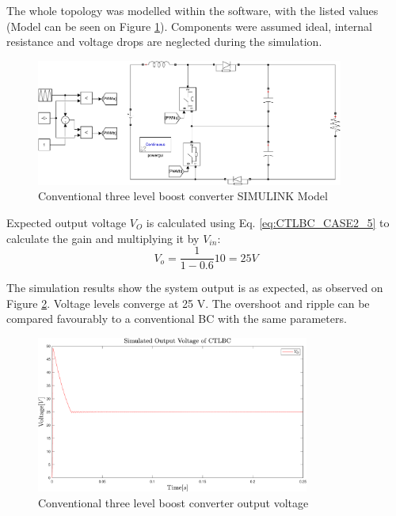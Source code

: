 The whole topology was modelled within the software, with the listed values (Model can be seen on Figure \ref{fig:Model_CTLBC}). Components were assumed ideal, internal resistance and voltage drops are neglected during the simulation. 

\begin{figure} [H]
   \centering
   \includegraphics[width=0.9\textwidth]{figures/dConventionalThreeLevelBC/Model_CTLBC.pdf}
    \caption{Conventional three level boost converter SIMULINK Model}
	\label{fig:Model_CTLBC}
\end{figure}

Expected output voltage $V_O$ is calculated using Eq. \ref{eq:CTLBC_CASE2_5} to calculate the gain and multiplying it by $V_{in}$: 
\begin{equation}
	{V_o}= \frac{1}{1-0.6}10=25V
	\label{eq:Simulation_CTLBC}
\end{equation}

The simulation results show the system output is as expected, as observed on Figure \ref {fig:Simulation_CTLBC}. Voltage levels converge at 25 V. The overshoot and ripple can be compared favourably to a conventional BC with the same parameters. 


\begin{figure} [H]
   \centering
   \includegraphics[width=0.8\textwidth]{figures/dConventionalThreeLevelBC/Simulation_CTLBC.pdf}
    \caption{Conventional three level boost converter output voltage}
	\label{fig:Simulation_CTLBC}
\end{figure}